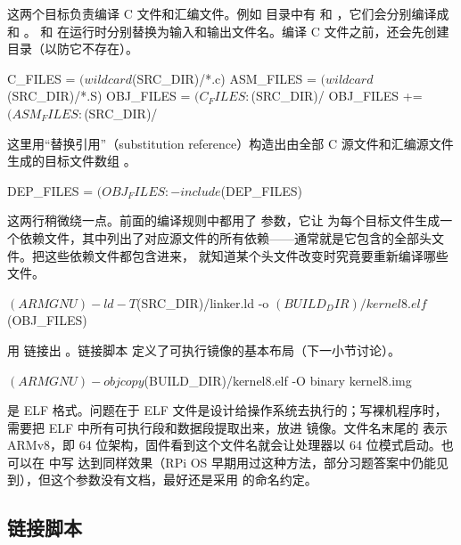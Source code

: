 这两个目标负责编译 C 文件和汇编文件。例如  目录中有  和 ，它们会分别编译成  和 。\code{\$<} 和  在运行时分别替换为输入和输出文件名。编译 C 文件之前，还会先创建  目录（以防它不存在）。

\begin{makecode}
C_FILES = $(wildcard $(SRC_DIR)/*.c)
ASM_FILES = $(wildcard $(SRC_DIR)/*.S)
OBJ_FILES = $(C_FILES:$(SRC_DIR)/%
OBJ_FILES += $(ASM_FILES:$(SRC_DIR)/%
\end{makecode}

这里用“替换引用”（substitution reference）构造出由全部 C 源文件和汇编源文件生成的目标文件数组 。

\begin{makecode}
DEP_FILES = $(OBJ_FILES:%
-include $(DEP_FILES)
\end{makecode}

这两行稍微绕一点。前面的编译规则中都用了  参数，它让  为每个目标文件生成一个依赖文件，其中列出了对应源文件的所有依赖——通常就是它包含的全部头文件。把这些依赖文件都包含进来， 就知道某个头文件改变时究竟要重新编译哪些文件。

\begin{makecode}
$(ARMGNU)-ld -T $(SRC_DIR)/linker.ld -o $(BUILD_DIR)/kernel8.elf  $(OBJ_FILES)
\end{makecode}

用  链接出 。链接脚本  定义了可执行镜像的基本布局（下一小节讨论）。

\begin{makecode}
$(ARMGNU)-objcopy $(BUILD_DIR)/kernel8.elf -O binary kernel8.img
\end{makecode}

 是 ELF 格式。问题在于 ELF 文件是设计给操作系统去执行的；写裸机程序时，需要把 ELF 中所有可执行段和数据段提取出来，放进  镜像。文件名末尾的  表示 ARMv8，即 64 位架构，固件看到这个文件名就会让处理器以 64 位模式启动。也可以在  中写  达到同样效果（RPi OS 早期用过这种方法，部分习题答案中仍能见到），但这个参数没有文档，最好还是采用  的命名约定。

\subsection{链接脚本}

